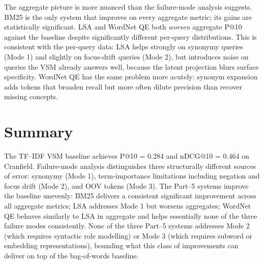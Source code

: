 \documentclass[11pt]{article}
\begin{document}
The aggregate picture is more nuanced than the failure-mode analysis
suggests. BM25 is the only system that improves on every aggregate metric;
its gains are statistically significant. LSA and WordNet QE both
\emph{worsen} aggregate P@10 against the baseline despite significantly
different per-query distributions. This is consistent with the per-query
data: LSA helps strongly on synonymy queries (Mode 1) and slightly on
focus-drift queries (Mode 2), but introduces noise on queries the VSM
already answers well, because the latent projection blurs surface
specificity. WordNet QE has the same problem more acutely: synonym
expansion adds tokens that broaden recall but more often dilute precision
than recover missing concepts.

\section{Summary}

The TF--IDF VSM baseline achieves P@10 = 0.284 and nDCG@10 = 0.464 on
Cranfield. Failure-mode analysis distinguishes three structurally
different sources of error: synonymy (Mode 1), term-importance
limitations including negation and focus drift (Mode 2), and OOV tokens
(Mode 3). The Part--5 systems improve the baseline unevenly: BM25
delivers a consistent significant improvement across all aggregate
metrics; LSA addresses Mode 1 but worsens aggregates; WordNet QE
behaves similarly to LSA in aggregate and helps essentially none of the
three failure modes consistently. None of the three Part--5 systems
addresses Mode 2 (which requires syntactic role modelling) or Mode 3
(which requires subword or embedding representations), bounding what
this class of improvements can deliver on top of the bag-of-words
baseline.
\end{document}
